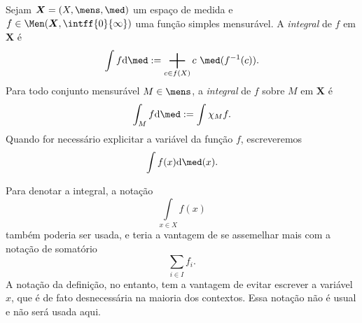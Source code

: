 

\begin{defi}
Sejam $\bm X = (X,\mens,\med)$ um espaço de medida e $f\in \Men(\bm X,\intff{0}{\infty})$ uma função simples mensurável.
A \emph{integral} de $f$ em $\bm X$ é
	\begin{equation*}
	\int f \dd\med := \sum_{c \in f(X)} c \ \med(f\inv(c)).
	\end{equation*}
Para todo conjunto mensurável $M \in \mens$, a \emph{integral} de $f$ sobre $M$ em $\bm X$ é
	\begin{equation*}
	\int_M f \dd\med := \int \idc_M f.
	\end{equation*}
Quando for necessário explicitar a variável da função $f$, escreveremos
	\begin{equation*}
	\int f(x) \dd \med(x).
	\end{equation*}
\end{defi}

Para denotar a integral, a notação
	\begin{equation*}
	\int\limits_{x \in X} f(x)
	\end{equation*}
também poderia ser usada, e teria a vantagem de se assemelhar mais com a notação de somatório
	\begin{equation*}
	\sum_{i \in I} f_i.
	\end{equation*}
A notação da definição, no entanto, tem a vantagem de evitar escrever a variável $x$, que é de fato desnecessária na maioria dos contextos. Essa notação não é usual e não será usada aqui.

